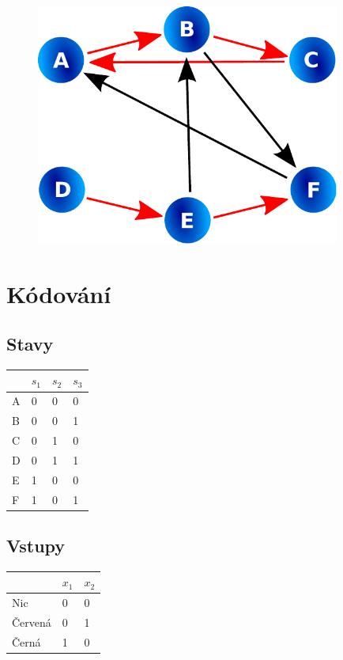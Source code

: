 \documentclass[titlepage]{article}
\begin{document}
\begin{figure}[ht!]
\centering
\includegraphics[width=10cm]{graf.pdf}
\end{figure}
\clearpage

\section{Kódování}
\subsection{Stavy}
\begin{center}
\begin{tabular}{|l|l|l|l|}
\hline
& {\bf $s_1$} & {\bf $s_2$} & {\bf $s_3$}\\
\hline
A & 0 & 0 & 0 \\
B & 0 & 0 & 1 \\
C & 0 & 1 & 0 \\
D & 0 & 1 & 1 \\
E & 1 & 0 & 0 \\
F & 1 & 0 & 1 \\
\hline
\end{tabular}
\end{center}

\subsection{Vstupy}
\begin{center}
\begin{tabular}{|l|l|l|}
\hline
& {\bf $x_1$} & {\bf $x_2$} \\
\hline
Nic & 0 & 0 \\
Červená & 0 & 1 \\
Černá & 1 & 0 \\
\hline
\end{tabular}
\end{center}
\end{document}

